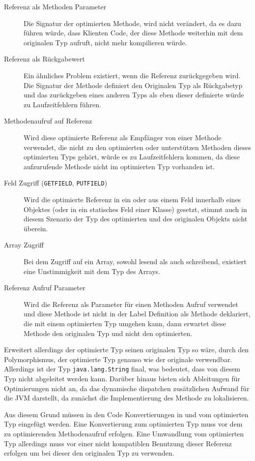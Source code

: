 \begin{description}
	\item[Referenz als Methoden Parameter] Die Signatur der 
	optimierten Methode, wird nicht verändert, da es dazu führen würde, dass
	Klienten Code, der diese Methode weiterhin mit dem originalen Typ aufruft, 
	nicht mehr kompilieren würde.
	\item[Referenz als Rückgabewert] Ein ähnliches Problem existiert, wenn die 
	Referenz zurückgegeben wird. Die Signatur der Methode definiert den Originalen
	Typ als Rückgabetyp und das zurückgeben eines anderen Typs als eben dieser 
	definierte würde zu Laufzeitfehlern führen.
	\item[Methodenaufruf auf Referenz] Wird diese optimierte Referenz als Empfänger 
	von einer Methode verwendet, die nicht zu den optimierten oder unterstützen
	Methoden dieses optimierten Typs gehört, würde es zu Laufzeitfehlern kommen, 
	da diese aufzurufende Methode nicht im optimierten Typ vorhanden ist. 
	\item[Feld Zugriff (\texttt{GETFIELD}, \texttt{PUTFIELD})] Wird die optimierte 
	Referenz in ein oder aus einem Feld innerhalb eines Objektes (oder in ein 
	statisches Feld einer Klasse) gesetzt, stimmt auch in diesem Szenario der Typ
	des optimierten und des originalen Objekts nicht überein.
	\item[Array Zugriff] Bei dem Zugriff auf ein Array, sowohl lesend als auch 
	schreibend, existiert eine Unstimmigkeit mit dem Typ des Arrays.
	\item[Referenz Aufruf Parameter] Wird die Referenz als Parameter für einen
	Methoden Aufruf verwendet und diese Methode ist nicht in der Label Definition
	als Methode deklariert, die mit einem optimierten Typ umgehen kann, dann 
	erwartet diese Methode den originalen Typ und nicht den optimierten.
\end{description}

Erweitert allerdings der optimierte Typ seinen originalen Typ so wäre, durch den 
Polymorphismus, der optimierte Typ genauso wie der originale verwendbar. Allerdings 
ist der Typ \texttt{java.lang.String} final, was bedeutet, dass von diesem Typ nicht 
abgeleitet werden kann. Darüber hinaus bieten sich Ableitungen für Optimierungen nicht
an, da das dynamische dispatchen zusätzlichen Aufwand für die JVM darstellt, da 
zunächst die Implementierung des Methode zu lokalisieren.

Aus diesem Grund müssen in den Code Konvertierungen in und vom optimierten Typ 
eingefügt werden. Eine Konvertierung zum optimierten Typ muss vor dem zu optimierenden
Methodenaufruf erfolgen. Eine Umwandlung vom optimierten Typ allerdings muss vor einer 
nicht kompatiblen Benutzung dieser Referenz erfolgen um bei dieser den originalen Typ 
zu verwenden.

